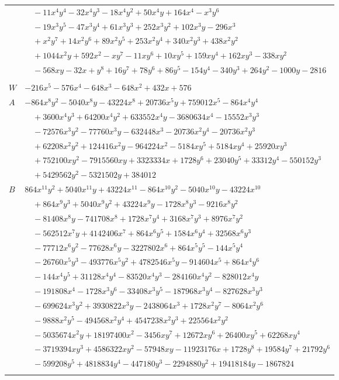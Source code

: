 \documentclass[11pt]{article}
\begin{document}
\begin{longtable}{@{}ll@{}}
 & $\quad -11x^{4}y^{4}-32x^{4}y^{3}-18x^{4}y^{2}+50x^{4}y+164x^{4}-x^{3}y^{6}$\\
 & $\quad -19x^{3}y^{5}-47x^{3}y^{4}+61x^{3}y^{3}+252x^{3}y^{2}+102x^{3}y-296x^{3}$\\
 & $\quad +x^{2}y^{7}+14x^{2}y^{6}+89x^{2}y^{5}+253x^{2}y^{4}+340x^{2}y^{3}+438x^{2}y^{2}$\\
 & $\quad +1044x^{2}y+592x^{2}-xy^{7}-11xy^{6}+10xy^{5}+159xy^{4}+162xy^{3}-338xy^{2}$\\
 & $\quad -568xy-32x+y^{8}+16y^{7}+78y^{6}+86y^{5}-154y^{4}-340y^{3}+264y^{2}-1000y-2816$\\
\addlinespace[3pt]
\multicolumn{2}{@{}l}{$i=34$, $m=72$, neighbours $2,5,6,10,12,18,23,26$}\\
$W$ & $-216x^{5}-576x^{4}-648x^{3}-648x^{2}+432x+576$\\
$A$ & $-864x^{8}y^{2}-5040x^{8}y-43224x^{8}+20736x^{5}y+759012x^{5}-864x^{4}y^{4}$\\
 & $\quad +3600x^{4}y^{3}+64200x^{4}y^{2}+633552x^{4}y-3680634x^{4}-15552x^{3}y^{3}$\\
 & $\quad -72576x^{3}y^{2}-77760x^{3}y-632448x^{3}-20736x^{2}y^{4}-20736x^{2}y^{3}$\\
 & $\quad +62208x^{2}y^{2}+124416x^{2}y-964224x^{2}-5184xy^{5}+5184xy^{4}+25920xy^{3}$\\
 & $\quad +752100xy^{2}-7915560xy+3323334x+1728y^{6}+23040y^{5}+33312y^{4}-550152y^{3}$\\
 & $\quad +5429562y^{2}-5321502y+384012$\\
$B$ & $864x^{11}y^{2}+5040x^{11}y+43224x^{11}-864x^{10}y^{2}-5040x^{10}y-43224x^{10}$\\
 & $\quad +864x^{9}y^{3}+5040x^{9}y^{2}+43224x^{9}y-1728x^{8}y^{3}-9216x^{8}y^{2}$\\
 & $\quad -81408x^{8}y-741708x^{8}+1728x^{7}y^{4}+3168x^{7}y^{3}+8976x^{7}y^{2}$\\
 & $\quad -562512x^{7}y+4142406x^{7}+864x^{6}y^{5}+1584x^{6}y^{4}+32568x^{6}y^{3}$\\
 & $\quad -77712x^{6}y^{2}-77628x^{6}y-3227802x^{6}+864x^{5}y^{5}-144x^{5}y^{4}$\\
 & $\quad -26760x^{5}y^{3}-493776x^{5}y^{2}+4782546x^{5}y-914604x^{5}+864x^{4}y^{6}$\\
 & $\quad -144x^{4}y^{5}+31128x^{4}y^{4}-83520x^{4}y^{3}-284160x^{4}y^{2}-828012x^{4}y$\\
 & $\quad -191808x^{4}-1728x^{3}y^{6}-33408x^{3}y^{5}-187968x^{3}y^{4}-827628x^{3}y^{3}$\\
 & $\quad -699624x^{3}y^{2}+3930822x^{3}y-2438064x^{3}+1728x^{2}y^{7}-8064x^{2}y^{6}$\\
 & $\quad -9888x^{2}y^{5}-494568x^{2}y^{4}+4547238x^{2}y^{3}+225564x^{2}y^{2}$\\
 & $\quad -5035674x^{2}y+18197400x^{2}-3456xy^{7}+12672xy^{6}+26400xy^{5}+62268xy^{4}$\\
 & $\quad -3719394xy^{3}+4586322xy^{2}-57948xy-11923176x+1728y^{8}+19584y^{7}+21792y^{6}$\\
 & $\quad -599208y^{5}+4818834y^{4}-447180y^{3}-2294880y^{2}+19418184y-1867824$\\
\addlinespace[3pt]
\end{longtable}
\endgroup
\end{document}
